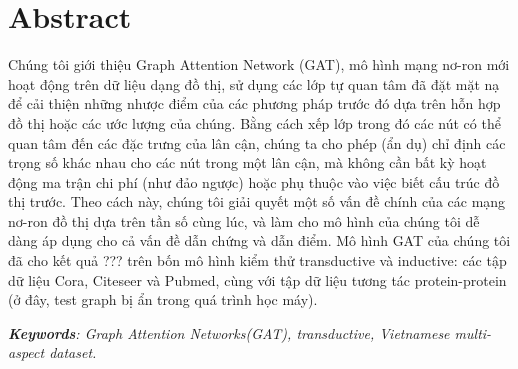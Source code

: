 \chapter*{Abstract}

Chúng tôi giới thiệu Graph Attention Network (GAT), mô hình mạng nơ-ron mới hoạt động trên dữ liệu dạng đồ thị, sử dụng các lớp tự quan tâm đã đặt mặt nạ để cải thiện những nhược điểm của các phương pháp trước đó dựa trên hỗn hợp đồ thị hoặc các ước lượng của chúng. Bằng cách xếp lớp trong đó các nút có thể quan tâm đến các đặc trưng của lân cận, chúng ta cho phép (ẩn dụ) chỉ định các trọng số khác nhau cho các nút trong một lân cận, mà không cần bất kỳ hoạt động ma trận chi phí (như đảo ngược) hoặc phụ thuộc vào việc biết cấu trúc đồ thị trước.
Theo cách này, chúng tôi giải quyết một số vấn đề chính của các mạng nơ-ron đồ thị dựa trên tần số cùng lúc, và làm cho mô hình của chúng tôi dễ dàng áp dụng cho cả vấn đề dẫn chứng và dẫn điểm. Mô hình GAT của chúng tôi đã cho kết quả ??? trên bốn mô hình kiểm thử transductive và inductive: các tập dữ liệu Cora, Citeseer và Pubmed, cùng với tập dữ liệu tương tác protein-protein (ở đây, test graph bị ẩn trong quá trình học máy).


\vspace{8pt}
\noindent \textit{\textbf{Keywords}: Graph Attention Networks(GAT), transductive, Vietnamese multi-aspect dataset.}

